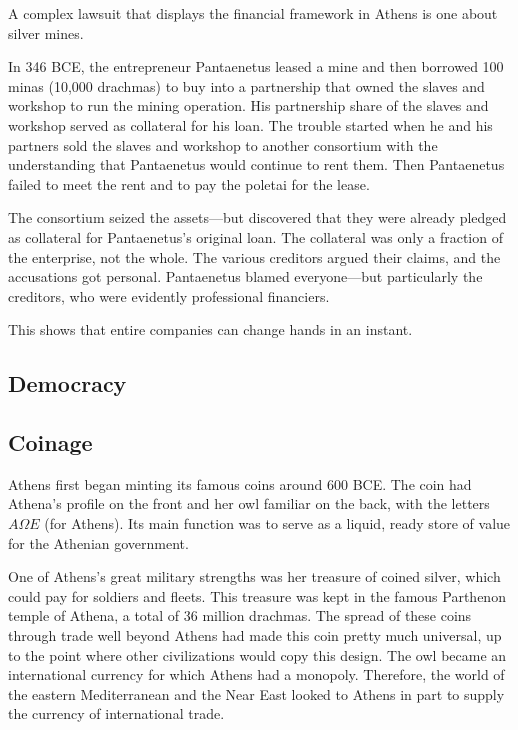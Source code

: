 \documentclass{article}
\begin{document}
    \begin{example}
      A complex lawsuit that displays the financial framework in Athens is one about silver mines. 

      In 346 BCE, the entrepreneur Pantaenetus leased a mine and then borrowed 100 minas (10,000 drachmas) to buy into a partnership that owned the slaves and workshop to run the mining operation. His partnership share of the slaves and workshop served as collateral for his loan. The trouble started when he and his partners sold the slaves and workshop to another consortium with the understanding that Pantaenetus would continue to rent them. Then Pantaenetus failed to meet the rent and to pay the poletai for the lease.

      The consortium seized the assets—but discovered that they were already pledged as collateral for Pantaenetus’s original loan. The collateral was only a fraction of the enterprise, not the whole. The various creditors argued their claims, and the accusations got personal. Pantaenetus blamed everyone—but particularly the creditors, who were evidently professional financiers. 

      This shows that entire companies can change hands in an instant.
    \end{example}

  \subsection{Democracy}

  \subsection{Coinage}

    \begin{finance}
      Athens first began minting its famous coins around 600 BCE. The coin had Athena's profile on the front and her owl familiar on the back, with the letters $A\Omega E$ (for Athens). Its main function was to serve as a liquid, ready store of value for the Athenian government. 
    \end{finance}

    One of Athens's great military strengths was her treasure of coined silver, which could pay for soldiers and fleets. This treasure was kept in the famous Parthenon temple of Athena, a total of 36 million drachmas. The spread of these coins through trade well beyond Athens had made this coin pretty much universal, up to the point where other civilizations would copy this design. The owl became an international currency for which Athens had a monopoly. Therefore, the world of the eastern Mediterranean and the Near East looked to Athens in part to supply the currency of international trade.
\end{document}
